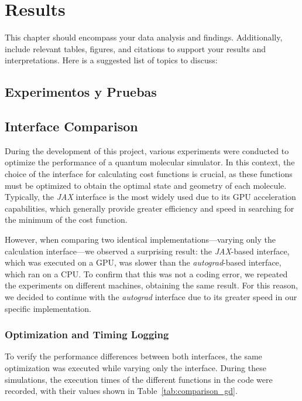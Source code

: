 \chapter{Results}
This chapter should encompass your data analysis and findings. Additionally, include relevant tables, figures, and citations to support your results and interpretations. Here is a suggested list of topics to discuss:
\section{Experimentos y Pruebas}

\section{Interface Comparison}
During the development of this project, various experiments were conducted to optimize the performance of a quantum molecular simulator. In this context, the choice of the interface for calculating cost functions is crucial, as these functions must be optimized to obtain the optimal state and geometry of each molecule. Typically, the \textit{JAX} interface is the most widely used due to its GPU acceleration capabilities, which generally provide greater efficiency and speed in searching for the minimum of the cost function.

However, when comparing two identical implementations—varying only the calculation interface—we observed a surprising result: the \textit{JAX}-based interface, which was executed on a GPU, was slower than the \textit{autograd}-based interface, which ran on a CPU. To confirm that this was not a coding error, we repeated the experiments on different machines, obtaining the same result. For this reason, we decided to continue with the \textit{autograd} interface due to its greater speed in our specific implementation.

\subsection{Optimization and Timing Logging}
To verify the performance differences between both interfaces, the same optimization was executed while varying only the interface. During these simulations, the execution times of the different functions in the code were recorded, with their values shown in Table~\ref{tab:comparison_gd}.

